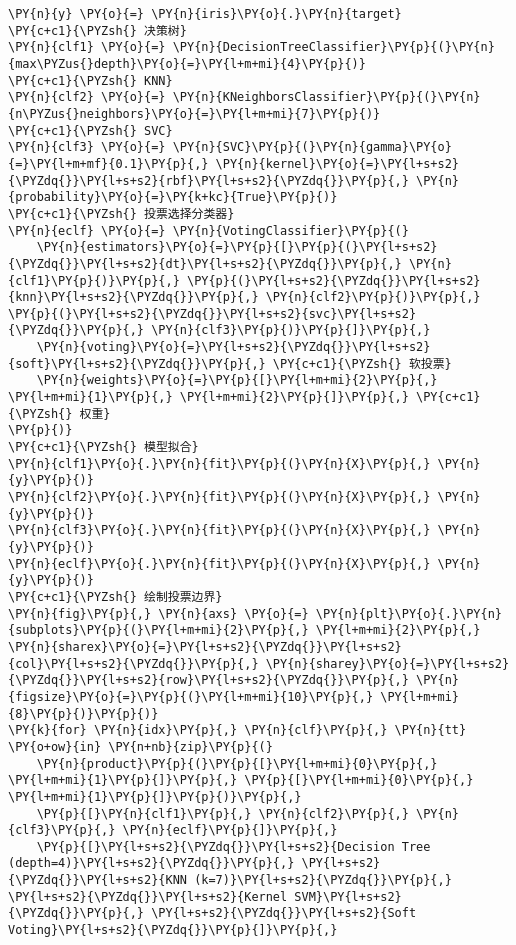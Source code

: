 \begin{Verbatim}[commandchars=\\\{\}]
\PY{n}{y} \PY{o}{=} \PY{n}{iris}\PY{o}{.}\PY{n}{target}
\PY{c+c1}{\PYZsh{} 决策树}
\PY{n}{clf1} \PY{o}{=} \PY{n}{DecisionTreeClassifier}\PY{p}{(}\PY{n}{max\PYZus{}depth}\PY{o}{=}\PY{l+m+mi}{4}\PY{p}{)}
\PY{c+c1}{\PYZsh{} KNN}
\PY{n}{clf2} \PY{o}{=} \PY{n}{KNeighborsClassifier}\PY{p}{(}\PY{n}{n\PYZus{}neighbors}\PY{o}{=}\PY{l+m+mi}{7}\PY{p}{)}
\PY{c+c1}{\PYZsh{} SVC}
\PY{n}{clf3} \PY{o}{=} \PY{n}{SVC}\PY{p}{(}\PY{n}{gamma}\PY{o}{=}\PY{l+m+mf}{0.1}\PY{p}{,} \PY{n}{kernel}\PY{o}{=}\PY{l+s+s2}{\PYZdq{}}\PY{l+s+s2}{rbf}\PY{l+s+s2}{\PYZdq{}}\PY{p}{,} \PY{n}{probability}\PY{o}{=}\PY{k+kc}{True}\PY{p}{)}
\PY{c+c1}{\PYZsh{} 投票选择分类器}
\PY{n}{eclf} \PY{o}{=} \PY{n}{VotingClassifier}\PY{p}{(}
    \PY{n}{estimators}\PY{o}{=}\PY{p}{[}\PY{p}{(}\PY{l+s+s2}{\PYZdq{}}\PY{l+s+s2}{dt}\PY{l+s+s2}{\PYZdq{}}\PY{p}{,} \PY{n}{clf1}\PY{p}{)}\PY{p}{,} \PY{p}{(}\PY{l+s+s2}{\PYZdq{}}\PY{l+s+s2}{knn}\PY{l+s+s2}{\PYZdq{}}\PY{p}{,} \PY{n}{clf2}\PY{p}{)}\PY{p}{,} \PY{p}{(}\PY{l+s+s2}{\PYZdq{}}\PY{l+s+s2}{svc}\PY{l+s+s2}{\PYZdq{}}\PY{p}{,} \PY{n}{clf3}\PY{p}{)}\PY{p}{]}\PY{p}{,}
    \PY{n}{voting}\PY{o}{=}\PY{l+s+s2}{\PYZdq{}}\PY{l+s+s2}{soft}\PY{l+s+s2}{\PYZdq{}}\PY{p}{,} \PY{c+c1}{\PYZsh{} 软投票}
    \PY{n}{weights}\PY{o}{=}\PY{p}{[}\PY{l+m+mi}{2}\PY{p}{,} \PY{l+m+mi}{1}\PY{p}{,} \PY{l+m+mi}{2}\PY{p}{]}\PY{p}{,} \PY{c+c1}{\PYZsh{} 权重}
\PY{p}{)}
\PY{c+c1}{\PYZsh{} 模型拟合}
\PY{n}{clf1}\PY{o}{.}\PY{n}{fit}\PY{p}{(}\PY{n}{X}\PY{p}{,} \PY{n}{y}\PY{p}{)}
\PY{n}{clf2}\PY{o}{.}\PY{n}{fit}\PY{p}{(}\PY{n}{X}\PY{p}{,} \PY{n}{y}\PY{p}{)}
\PY{n}{clf3}\PY{o}{.}\PY{n}{fit}\PY{p}{(}\PY{n}{X}\PY{p}{,} \PY{n}{y}\PY{p}{)}
\PY{n}{eclf}\PY{o}{.}\PY{n}{fit}\PY{p}{(}\PY{n}{X}\PY{p}{,} \PY{n}{y}\PY{p}{)}
\PY{c+c1}{\PYZsh{} 绘制投票边界}
\PY{n}{fig}\PY{p}{,} \PY{n}{axs} \PY{o}{=} \PY{n}{plt}\PY{o}{.}\PY{n}{subplots}\PY{p}{(}\PY{l+m+mi}{2}\PY{p}{,} \PY{l+m+mi}{2}\PY{p}{,} \PY{n}{sharex}\PY{o}{=}\PY{l+s+s2}{\PYZdq{}}\PY{l+s+s2}{col}\PY{l+s+s2}{\PYZdq{}}\PY{p}{,} \PY{n}{sharey}\PY{o}{=}\PY{l+s+s2}{\PYZdq{}}\PY{l+s+s2}{row}\PY{l+s+s2}{\PYZdq{}}\PY{p}{,} \PY{n}{figsize}\PY{o}{=}\PY{p}{(}\PY{l+m+mi}{10}\PY{p}{,} \PY{l+m+mi}{8}\PY{p}{)}\PY{p}{)}
\PY{k}{for} \PY{n}{idx}\PY{p}{,} \PY{n}{clf}\PY{p}{,} \PY{n}{tt} \PY{o+ow}{in} \PY{n+nb}{zip}\PY{p}{(}
    \PY{n}{product}\PY{p}{(}\PY{p}{[}\PY{l+m+mi}{0}\PY{p}{,} \PY{l+m+mi}{1}\PY{p}{]}\PY{p}{,} \PY{p}{[}\PY{l+m+mi}{0}\PY{p}{,} \PY{l+m+mi}{1}\PY{p}{]}\PY{p}{)}\PY{p}{,}
    \PY{p}{[}\PY{n}{clf1}\PY{p}{,} \PY{n}{clf2}\PY{p}{,} \PY{n}{clf3}\PY{p}{,} \PY{n}{eclf}\PY{p}{]}\PY{p}{,}
    \PY{p}{[}\PY{l+s+s2}{\PYZdq{}}\PY{l+s+s2}{Decision Tree (depth=4)}\PY{l+s+s2}{\PYZdq{}}\PY{p}{,} \PY{l+s+s2}{\PYZdq{}}\PY{l+s+s2}{KNN (k=7)}\PY{l+s+s2}{\PYZdq{}}\PY{p}{,} \PY{l+s+s2}{\PYZdq{}}\PY{l+s+s2}{Kernel SVM}\PY{l+s+s2}{\PYZdq{}}\PY{p}{,} \PY{l+s+s2}{\PYZdq{}}\PY{l+s+s2}{Soft Voting}\PY{l+s+s2}{\PYZdq{}}\PY{p}{]}\PY{p}{,}

\end{Verbatim}
